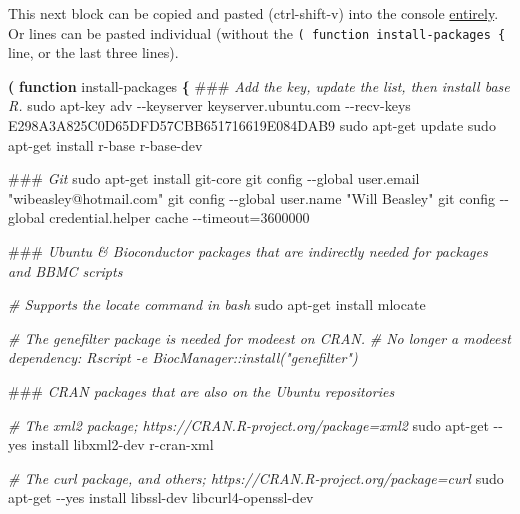 \documentclass[
]{book}
\newenvironment{Shaded}{\begin{snugshade}}{\end{snugshade}}
\newcommand{\AlertTok}[1]{\textcolor[rgb]{0.94,0.16,0.16}{#1}}
\newcommand{\CommentTok}[1]{\textcolor[rgb]{0.56,0.35,0.01}{\textit{#1}}}
\newcommand{\FunctionTok}[1]{\textcolor[rgb]{0.00,0.00,0.00}{#1}}
\newcommand{\KeywordTok}[1]{\textcolor[rgb]{0.13,0.29,0.53}{\textbf{#1}}}
\newcommand{\NormalTok}[1]{#1}
\newcommand{\StringTok}[1]{\textcolor[rgb]{0.31,0.60,0.02}{#1}}
\begin{document}
This next block can be copied and pasted (ctrl-shift-v) into the console \href{https://stackoverflow.com/a/43164204}{entirely}. Or lines can be pasted individual (without the \texttt{(\ function\ install-packages\ \{} line, or the last three lines).

\begin{Shaded}
\begin{Highlighting}[]
\KeywordTok{(} \KeywordTok{function}\FunctionTok{ install{-}packages} \KeywordTok{\{}
  \AlertTok{\#\#\#}\CommentTok{ Add the key, update the list, then install base R.}
  \FunctionTok{sudo}\NormalTok{ apt{-}key adv {-}{-}keyserver keyserver.ubuntu.com {-}{-}recv{-}keys E298A3A825C0D65DFD57CBB651716619E084DAB9}
  \FunctionTok{sudo}\NormalTok{ apt{-}get update}
  \FunctionTok{sudo}\NormalTok{ apt{-}get install r{-}base r{-}base{-}dev}

  \AlertTok{\#\#\#}\CommentTok{ Git}
  \FunctionTok{sudo}\NormalTok{ apt{-}get install git{-}core}
  \FunctionTok{git}\NormalTok{ config {-}{-}global user.email }\StringTok{"wibeasley@hotmail.com"}
  \FunctionTok{git}\NormalTok{ config {-}{-}global user.name }\StringTok{"Will Beasley"}
  \FunctionTok{git}\NormalTok{ config {-}{-}global credential.helper }\StringTok{\textquotesingle{}cache {-}{-}timeout=3600000\textquotesingle{}}

  \AlertTok{\#\#\#}\CommentTok{ Ubuntu \& Bioconductor packages that are indirectly needed for packages and BBMC scripts}

  \CommentTok{\# Supports the \textasciigrave{}locate\textasciigrave{} command in bash}
  \FunctionTok{sudo}\NormalTok{ apt{-}get install mlocate}

  \CommentTok{\# The genefilter package is needed for \textquotesingle{}modeest\textquotesingle{} on CRAN.}
  \CommentTok{\# No longer a modeest dependency: Rscript {-}e \textquotesingle{}BiocManager::install("genefilter")\textquotesingle{}}

  \AlertTok{\#\#\#}\CommentTok{ CRAN packages that are also on the Ubuntu repositories}

  \CommentTok{\# The \textquotesingle{}xml2\textquotesingle{} package; https://CRAN.R{-}project.org/package=xml2}
  \FunctionTok{sudo}\NormalTok{ apt{-}get {-}{-}yes install libxml2{-}dev r{-}cran{-}xml}

  \CommentTok{\# The \textquotesingle{}curl\textquotesingle{} package, and others; https://CRAN.R{-}project.org/package=curl}
  \FunctionTok{sudo}\NormalTok{ apt{-}get {-}{-}yes install libssl{-}dev libcurl4{-}openssl{-}dev}


\end{Highlighting}
\end{Shaded}
\end{document}
